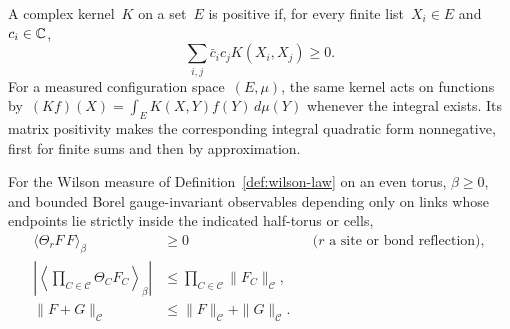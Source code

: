 \begin{definition}\label{def:iv-positive-kernel}
A complex kernel~$K$ on a set~$E$ is positive if, for every finite list~$X_i\in E$ and~$c_i\in\mathbb C$,
\begin{equation*}
 \sum_{i,j}\bar c_ic_jK(X_i,X_j)\ge0.
\end{equation*}
For a measured configuration space~$(E,\mu)$, the same kernel acts on functions by~$(Kf)(X)=\int_EK(X,Y)f(Y)\,d\mu(Y)$ whenever the integral exists. Its matrix positivity makes the corresponding integral quadratic form nonnegative, first for finite sums and then by approximation.
\end{definition}

\begin{lemma}\label{lem:iv-reflection}
For the Wilson measure of Definition~\ref{def:wilson-law} on an even torus, $\beta\ge0$, and bounded Borel gauge-invariant observables depending only on links whose endpoints lie strictly inside the indicated half-torus or cells,
\begin{align}
 \langle\Theta_r F\,F\rangle_\beta&\ge0
 &&\text{($r$ a site or bond reflection)},\label{eq:iv-lattice-rp}\\
 \left|\left\langle\prod_{C\in\mathcal C}\Theta_C F_C\right\rangle_\beta\right|
 &\le\prod_{C\in\mathcal C}\|F_C\|_{\mathcal C},\label{eq:iv-chessboard}\\
 \|F+G\|_{\mathcal C}&\le\|F\|_{\mathcal C}+\|G\|_{\mathcal C}.\nonumber
\end{align}
\end{lemma}

